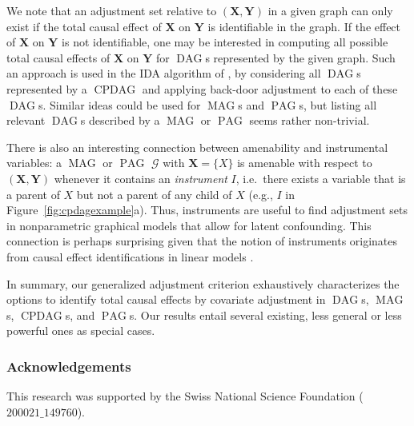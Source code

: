 \documentclass[]{article}
\DeclareMathOperator{\CPDAG}{CPDAG}
\DeclareMathOperator{\DAG}{DAG}
\DeclareMathOperator{\MAG}{MAG}
\DeclareMathOperator{\PAG}{PAG}
\theoremstyle{definition}
\theoremstyle{remark}
\newcommand{\g}[1][G]{\mathcal{#1}}
\begin{document}
We note that an adjustment set relative to $(\mathbf{X},\mathbf{Y})$ in a given graph can only exist if the total causal effect of $\mathbf{X}$ on $\mathbf{Y}$ is identifiable in the graph. If the effect of $\mathbf{X}$ on $\mathbf{Y}$ is  not identifiable, one may be interested in computing all possible total causal effects of $\mathbf{X}$ on $\mathbf{Y}$ for $\DAG$s represented by the given graph. Such an approach is used in the IDA algorithm of \cite{MaathuisKalischBuehlmann09,MaathuisColomboKalischBuehlmann10}, by  considering all $\DAG$s represented by a $\CPDAG$ and applying back-door adjustment to each of these $\DAG$s. Similar ideas could be used for $\MAG$s and $\PAG$s, but listing all relevant $\DAG$s described by a $\MAG$ or $\PAG$ seems rather non-trivial.

There is also an interesting connection between amenability and instrumental variables:
a $\MAG$ or $\PAG$ $\g$ with $\mathbf{X}=\{X\}$
is amenable with respect to $(\mathbf{X},\mathbf{Y})$ whenever it
contains an \emph{instrument} $I$,
i.e.\ there exists a variable that is a parent of $X$ but not a parent
of any child of $X$ (e.g., $I$ in Figure~\ref{fig:cpdagexample}a).
Thus, instruments are useful to find
adjustment sets in nonparametric graphical models
that allow for latent confounding.
This connection is perhaps surprising
given that the notion of instruments originates from causal effect
identifications in linear models \citep{AngristIR96}.


In summary, our generalized adjustment criterion exhaustively
characterizes the options
to identify total causal effects by covariate adjustment
in $\DAG$s, $\MAG$s, $\CPDAG$s, and $\PAG$s.
Our results entail several existing, less general or less powerful ones
\citep{pearl1993bayesian,shpitser2012validity,TextorLiskiewicz2011,vanconstructing,maathuis2013generalized}
as special cases.

\subsubsection*{Acknowledgements}
This research was supported by the Swiss National Science
Foundation ($200021\_149760$).


\end{document}

